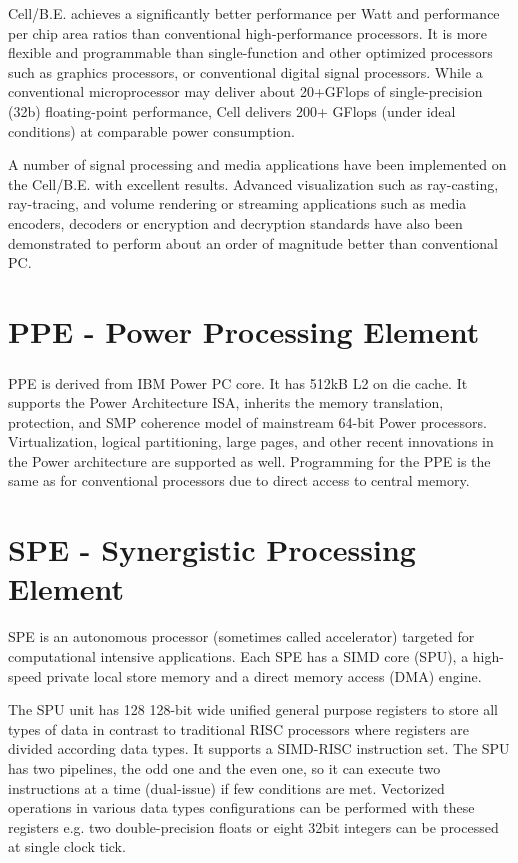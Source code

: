 \mbox{Cell/B.E.} achieves a significantly better performance per Watt and performance per chip area ratios than conventional high-performance processors.
It is more flexible and programmable than single-function and other optimized processors such as graphics processors, or conventional digital signal processors.
While a conventional microprocessor may deliver about 20+GFlops of single-precision (32b) floating-point performance, Cell delivers 200+ GFlops (under ideal conditions) at comparable power consumption.

A number of signal processing and media applications have been implemented on the \mbox{Cell/B.E.} with excellent results.
Advanced visualization such as ray-casting, ray-tracing, and volume rendering or streaming applications such as media encoders, decoders or encryption and decryption standards have also been demonstrated to perform about an order of magnitude better than conventional PC.


\section{PPE - Power Processing Element}

PPE is derived from IBM Power PC\textsuperscript{\textregistered} core. It has 512kB L2 on die cache.
It supports the Power Architecture ISA, inherits the memory translation, protection, and SMP coherence model of mainstream 64-bit Power processors.
Virtualization, logical partitioning, large pages, and other recent innovations in the Power architecture are supported as well.
Programming for the PPE is the same as for conventional processors due to direct access to central memory.

\section{SPE - Synergistic Processing Element}

\par
SPE is an autonomous processor (sometimes called accelerator) targeted for computational intensive applications.
Each SPE has a SIMD core (SPU), a high-speed private local store memory and a direct memory access (DMA) engine.

\par
The SPU unit has 128 128-bit wide unified general purpose registers to store all types of data in contrast to traditional RISC processors where registers are divided according data types.
It supports a SIMD-RISC instruction set.
The SPU has two pipelines, the odd one and the even one, so it can execute two instructions at a time (dual-issue) if few conditions are met.
Vectorized operations in various data types configurations can be performed with these registers e.g. two double-precision floats or eight 32bit integers can be processed at single clock tick.

